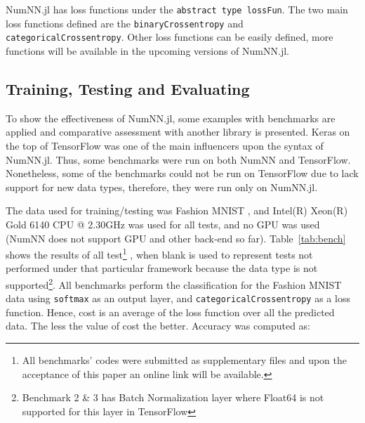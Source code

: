 NumNN.jl has loss functions under the \texttt{abstract type lossFun}. The two main loss functions defined are the \texttt{binaryCrossentropy} and \texttt{categoricalCrossentropy}. Other loss functions can be easily defined, more functions will be available in the upcoming versions of NumNN.jl.


\subsection{Training, Testing and Evaluating}
To show the effectiveness of NumNN.jl, some examples with benchmarks are applied and comparative assessment with another library is presented. Keras \cite{Collet2015} on the top of TensorFlow was one of the main influencers upon the syntax of NumNN.jl. Thus, some benchmarks were run on both NumNN and TensorFlow. Nonetheless, some of the benchmarks could not be run on TensorFlow due to lack support for new data types, therefore, they were run only on NumNN.jl.

The data used for training/testing was Fashion MNIST \cite{Xiao2017}, and Intel(R) Xeon(R) Gold 6140 CPU @ 2.30GHz was used for all tests, and no GPU was used (NumNN does not support GPU and other back-end so far). Table~\ref{tab:bench} shows the results of all test\footnote{All benchmarks' codes were submitted as supplementary files and upon the acceptance of this paper an online link will be available.}
, when blank is used to represent tests not performed under that particular framework because the data type is not supported\footnote{\label{batchnorm}Benchmark 2 \& 3 has Batch Normalization layer where Float64 is not supported for this layer in TensorFlow}. All benchmarks perform the classification for the Fashion MNIST data using \texttt{softmax} as an output layer, and \texttt{categoricalCrossentropy} as a loss function. Hence, cost is an average of the loss function over all the predicted data. The less the value of cost the better. Accuracy was computed as:

